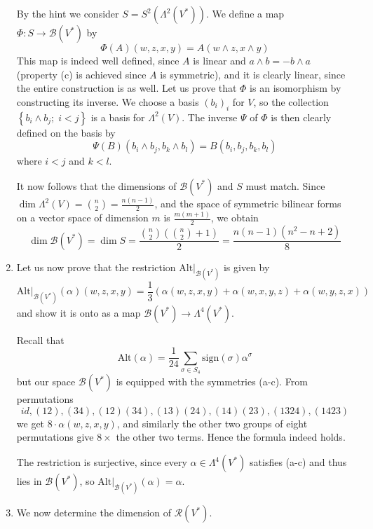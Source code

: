 \documentclass[a4paper, 12pt]{article}
\begin{document}
\begin{Exercise}
\begin{enumerate}[label=(\roman*)]
            By the hint we consider $S = S^2(\Lambda^2(V^*))$.
            We define a map $\Phi \colon S \to \mathcal{B}(V^*)$ by
            \[
                \Phi(A)(w,z,x,y) = A(w \wedge z, x \wedge y)
            \]
            This map is indeed well defined, since $A$ is linear and $a \wedge b = -b \wedge a$
            (property (c) is achieved since $A$ is symmetric),
            and it is clearly linear, since the entire construction is as well.
            Let us prove that $\Phi$ is an isomorphism by constructing its inverse.
            We choose a basis $(b_i)_i$ for $V$, so the collection $\left\{ b_i\wedge b_j ; \; i < j \right\}$ is a basis for $\Lambda^2(V)$.
            The inverse $\Psi$ of $\Phi$ is then clearly defined on the basis by
            \[
                \Psi(B)(b_i\wedge b_j, b_k \wedge b_l) = B(b_i, b_j, b_k, b_l)
            \]
            where $i < j$ and $k<l$.

            It now follows that the dimensions of $\mathcal{B}(V^*)$ and $S$ must match.
            Since $\dim \Lambda^2(V) = \binom{n}{2} = \frac{n(n-1)}{2}$,
            and the space of symmetric bilinear forms on a vector space of dimension $m$ is $\frac{m(m+1)}{2}$,
            we obtain
            \[
                \dim\mathcal{B}(V^*)
                = \dim S
                = \frac{\binom{n}{2}\left( \binom{n}{2} + 1 \right)}{2}
                = \frac{n(n-1)(n^2-n+2)}{8}
            \]
        \item Let us now prove that the restriction $\text{Alt}|_{\mathcal{B}(V^*)}$ is given by
            \[
                \text{Alt}|_{\mathcal{B}(V^*)}(\alpha)(w,z,x,y)
                = \frac{1}{3} \left( \alpha(w,z,x,y) + \alpha(w, x,y,z) + \alpha(w,y,z,x) \right)
            \]
            and show it is onto as a map $\mathcal{B}(V^*) \to \Lambda^4(V^*)$.

            Recall that
            \[
                \text{Alt}(\alpha)
                = \frac{1}{24} \sum_{\sigma\in S_4} \text{sign}(\sigma)\alpha^\sigma
            \]
            but our space $\mathcal{B}(V^*)$ is equipped with the symmetries (a-c).
            From permutations
            \[
                id,(12),(34),(12)(34),(13)(24),(14)(23),(1324),(1423)
            \]
            we get $8\cdot\alpha(w, z, x, y)$,
            and similarly the other two groups of eight permutations give $8\times$ the other two terms.
            Hence the formula indeed holds.

            The restriction is surjective, since every $\alpha \in \Lambda^4(V^*)$ satisfies (a-c) and thus lies in $\mathcal{B}(V^*)$,
            so $\text{Alt}|_{\mathcal{B}(V^*)}(\alpha) = \alpha$.
        \item We now determine the dimension of $\mathcal{R}(V^*)$.


\end{enumerate}
\end{Exercise}
\end{document}
